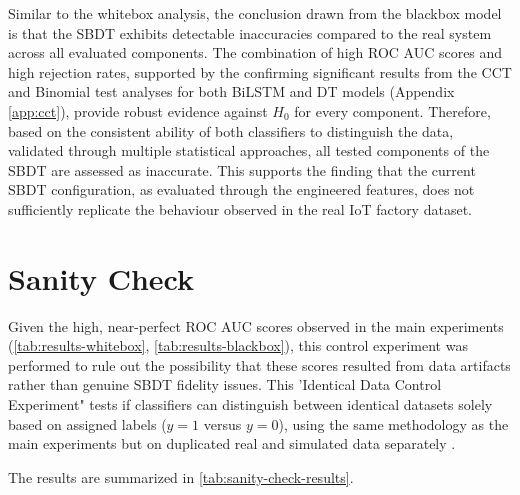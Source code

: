 Similar to the whitebox analysis, the conclusion drawn from the blackbox model is that the SBDT exhibits detectable inaccuracies compared to the real system across all evaluated components. The combination of high ROC AUC scores and high rejection rates, supported by the confirming significant results from the CCT and Binomial test analyses for both BiLSTM and DT models (Appendix \ref{app:cct}), provide robust evidence against $H_0$ for every component. Therefore, based on the consistent ability of both classifiers to distinguish the data, validated through multiple statistical approaches, all tested components of the SBDT are assessed as inaccurate. This supports the finding that the current SBDT configuration, as evaluated through the engineered features, does not sufficiently replicate the behaviour observed in the real IoT factory dataset.

\section{Sanity Check}
\label{sec:sanity-check}

Given the high, near-perfect ROC AUC scores observed in the main experiments (\autoref{tab:results-whitebox}, \autoref{tab:results-blackbox}), this control experiment was performed to rule out the possibility that these scores resulted from data artifacts rather than genuine SBDT fidelity issues. This 'Identical Data Control Experiment" tests if classifiers can distinguish between identical datasets solely based on assigned labels ($y=1$ versus $y=0$), using the same methodology as the main experiments but on duplicated real and simulated data separately \autocite{adebayo2018sanity}.

The results are summarized in \autoref{tab:sanity-check-results}.


